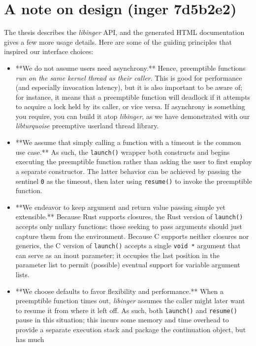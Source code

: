 \documentclass[12pt,letterpaper,openright]{report}
\begin{document}
\section{A note on design (inger 7d5b2e2)}

The thesis describes the \textit{libinger} API, and the generated HTML documentation gives a few more usage
details.  Here are some of the guiding principles that inspired our interface choices:
\begin{itemize}
\item **We do not assume users need asynchrony.**  Hence, preemptible functions \textit{run on the same kernel
	thread as their caller}.  This is good for performance (and especially invocation latency), but
	it is also important to be aware of; for instance, it means that a preemptible function will
	deadlock if it attempts to acquire a lock held by its caller, or vice versa.  If asynchrony is
	something you require, you can build it atop \textit{libinger}, as we have demonstrated with our
	\textit{libturquoise} preemptive userland thread library.
\item **We assume that simply calling a function with a timeout is the common use case.**  As such, the
	\texttt{launch()} wrapper both constructs and begins executing the preemptible function rather than
	asking the user to first employ a separate constructor.  The latter behavior can be achieved by
	passing the sentinel \texttt{0} as the timeout, then later using \texttt{resume()} to invoke the preemptible
	function.
\item **We endeavor to keep argument and return value passing simple yet extensible.**  Because Rust
	supports closures, the Rust version of \texttt{launch()} accepts only nullary functions: those seeking
	to pass arguments should just capture them from the environment.  Because C supports neither
	closures nor generics, the C version of \texttt{launch()} accepts a single \texttt{void *} argument that can
	serve as an inout parameter; it occupies the last position in the parameter list to permit
	(possible) eventual support for variable argument lists.
\item **We choose defaults to favor flexibility and performance.**  When a preemptible function times
	out, \textit{libinger} assumes the caller might later want to resume it from where it left off.  As
	such, both \texttt{launch()} and \texttt{resume()} pause in this situation; this incurs some memory and time
	overhead to provide a separate execution stack and package the continuation object, but has much

\end{itemize}
\end{document}
